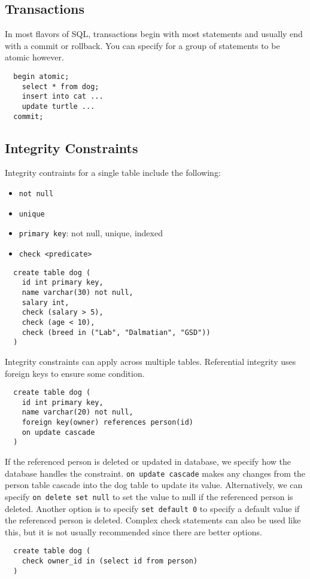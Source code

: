 \documentclass{math}
\begin{document}
\subsection*{Transactions}
In most flavors of SQL, transactions begin with most statements and usually end
with a commit or rollback. You can specify for a group of statements to be
atomic however.
\begin{lstlisting}
  begin atomic;
    select * from dog;
    insert into cat ...
    update turtle ...
  commit;
\end{lstlisting}

\subsection*{Integrity Constraints}
Integrity contraints for a single table include the following:
\begin{itemize}
  \item \texttt{not null}
  \item \texttt{unique}
  \item \texttt{primary key}: not null, unique, indexed
  \item \texttt{check \textless predicate\textgreater}
\end{itemize}
\begin{lstlisting}
  create table dog (
    id int primary key,
    name varchar(30) not null,
    salary int,
    check (salary > 5),
    check (age < 10),
    check (breed in ("Lab", "Dalmatian", "GSD"))
  )
\end{lstlisting}
Integrity constraints can apply across multiple tables. Referential integrity
uses foreign keys to ensure some condition.
\begin{lstlisting}
  create table dog (
    id int primary key,
    name varchar(20) not null,
    foreign key(owner) references person(id)
    on update cascade
  )
\end{lstlisting}
If the referenced person is deleted or updated in database, we specify how the
database handles the constraint. \texttt{on update cascade} makes any changes
from the person table cascade into the dog table to update its value.
Alternatively, we can specify \texttt{on delete set null} to set the value to
null if the referenced person is deleted. Another option is to specify
\texttt{set default 0} to specify a default value if the referenced person is
deleted. Complex check statements can also be used like this, but it is not
usually recommended since there are better options.
\begin{lstlisting}
  create table dog (
    check owner_id in (select id from person)
  )
\end{lstlisting}
\end{document}
